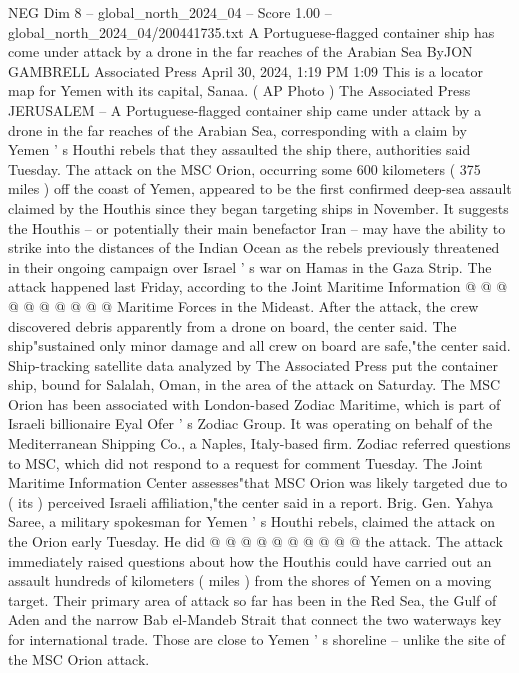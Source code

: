 \begin{textsample}{NEG Dim 8 – global\_north\_2024\_04 – Score 1.00 – global\_north\_2024\_04/200441735.txt}  \label{ex:f8_neg_404}
A Portuguese-flagged container ship has come under attack by a drone in the far reaches of the Arabian Sea ByJON GAMBRELL Associated Press April 30, 2024, 1:19 PM 1:09 This is a locator map for Yemen with its capital, Sanaa. ( AP Photo ) The Associated Press JERUSALEM -- A Portuguese-flagged container ship came under attack by a drone in the far reaches of the Arabian Sea, corresponding with a claim by Yemen ' s Houthi rebels that they assaulted the ship there, authorities said Tuesday.
The attack on the MSC Orion, occurring some 600 kilometers ( 375 miles ) off the coast of Yemen, appeared to be the first confirmed deep-sea assault claimed by the Houthis since they began targeting ships in November.
It suggests the Houthis -- or potentially their main benefactor Iran -- may have the ability to strike into the distances of the Indian Ocean as the rebels previously threatened in their ongoing campaign over Israel ' s war on Hamas in the Gaza Strip.
The attack happened last Friday, according to the Joint Maritime Information @ @ @ @ @ @ @ @ @ @ Maritime Forces in the Mideast.
After the attack, the crew discovered debris apparently from a drone on board, the center said.
The ship"sustained only minor damage and all crew on board are safe,"the center said.
Ship-tracking satellite data analyzed by The Associated Press put the container ship, bound for Salalah, Oman, in the area of the attack on Saturday.
The MSC Orion has been associated with London-based Zodiac Maritime, which is part of Israeli billionaire Eyal Ofer ' s Zodiac Group.
It was operating on behalf of the Mediterranean Shipping Co., a Naples, Italy-based firm.
Zodiac referred questions to MSC, which did not respond to a request for comment Tuesday.
The Joint Maritime Information Center assesses"that MSC Orion was likely targeted due to ( its ) perceived Israeli affiliation,"the center said in a report.
Brig.
Gen.
Yahya Saree, a military spokesman for Yemen ' s Houthi rebels, claimed the attack on the Orion early Tuesday.
He did @ @ @ @ @ @ @ @ @ @ the attack.
The attack immediately raised questions about how the Houthis could have carried out an assault hundreds of kilometers ( miles ) from the shores of Yemen on a moving target.
Their primary area of attack so far has been in the Red Sea, the Gulf of Aden and the narrow Bab el-Mandeb Strait that connect the two waterways key for international trade.
Those are close to Yemen ' s shoreline -- unlike the site of the MSC Orion attack.

\end{textsample}
